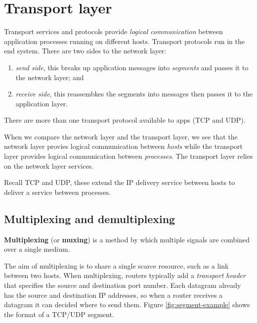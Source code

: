 \chapter{Transport layer}

Transport services and protocols provide \emph{logical communication} between application processes running on different hosts. Transport protocols run in the end system. There are two sides to the network layer:
\begin{enumerate}
    \item \emph{send side}, this breaks up application messages into \emph{segments} and passes it to the network layer; and
    \item \emph{receive side}, this reassembkes the segments into messages then passes it to the application layer.
\end{enumerate}

There are more than one transport protocol available to apps (TCP and UDP). 

When we compare the network layer and the transport layer, we see that the network layer provies logical communication between \emph{hosts} while the transport layer provides logical communication between \emph{processes}. The transport layer relies on the network layer services. 

Recall TCP and UDP, these extend the IP delivery service between hosts to deliver a service between processes.

\section{Multiplexing and demultiplexing}

\begin{definition}[Multiplexing]
    \textbf{Multiplexing} (or \textbf{muxing}) is a method by which multiple signals are combined over a single medium.
\end{definition}

The aim of multiplexing is to share a single scarce resource, such as a link between two hosts. When multiplexing, routers typically add a \emph{transport header} that specifies the source and destination port number. Each datagram already has the source and destination IP addresses, so when a router receives a datagram it can decided where to send them. Figure \ref{fig:segment-example} shows the format of a TCP/UDP segment.

